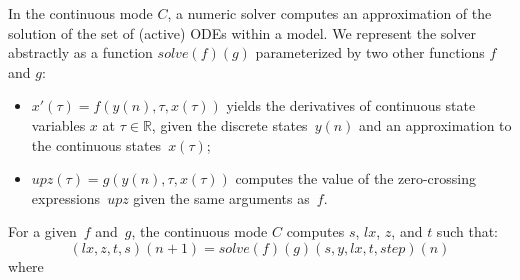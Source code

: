 \documentclass[11pt,titlepage,twoside]{report}
\newcommand{\lx}{\ensuremath{\mathit{lx}}}
\newcommand{\Solve}[2]{\mathit{solve}({#1})({#2})}
\newcommand{\bR}{\mathbb{R}}
\begin{document}
In the continuous mode $C$, a numeric solver computes an approximation of 
the solution of the set of (active) ODEs within a model.
We represent the solver abstractly as a function $\Solve{f}{g}$ 
parameterized by two other functions $f$ and $g$:
\begin{itemize}
\item
$x'(\tau) = f(y(n), \tau, x(\tau))$ yields the derivatives of continuous 
state variables $x$ at $\tau \in \bR$,
given
the discrete states~$y(n)$ and an approximation to the continuous 
states~$x(\tau)$;
\item
\mbox{$\mathit{upz}(\tau) = g(y(n), \tau, x(\tau))$} computes the value of 
the zero-crossing expressions~$\mathit{upz}$ given the same arguments 
as~$f$.
\end{itemize}
For a given~$f$ and~$g$, the continuous mode $C$ computes
$s$, $\lx$, $z$, and $t$ such that:
\[
(\lx, z, t, s)(n+1) = \Solve{f}{g}(s, y, \lx, t, step)(n)
\]
where
\end{document}
